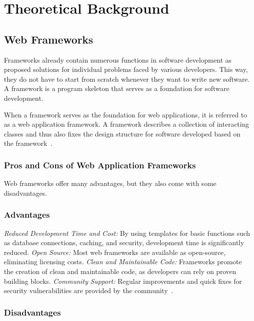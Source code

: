 \documentclass[conference]{IEEEtran}
\begin{document}
\section{Theoretical Background}

\subsection{Web Frameworks}

Frameworks already contain numerous functions in software development as proposed solutions for individual problems faced by various developers. This way, they do not have to start from scratch whenever they want to write new software. A framework is a program skeleton that serves as a foundation for software development.

When a framework serves as the foundation for web applications, it is referred to as a web application framework. A framework describes a collection of interacting classes and thus also fixes the design structure for software developed based on the framework~\cite{ionos_webframeworks}.
\newline\subsubsection{Pros and Cons of Web Application Frameworks}
Web frameworks offer many advantages, but they also come with some disadvantages.
\newline\subsubsection{Advantages}
\textit{Reduced Development Time and Cost:} By using templates for basic functions such as database connections, caching, and security, development time is significantly reduced.
\newline\textit{Open Source:} Most web frameworks are available as open-source, eliminating licensing costs.
\newline\textit{Clean and Maintainable Code:} Frameworks promote the creation of clean and maintainable code, as developers can rely on proven building blocks.
\newline\newline\newline\textit{Community Support:} Regular improvements and quick fixes for security vulnerabilities are provided by the community~\cite{ionos_webframeworks}.
\newline
\subsubsection{Disadvantages}
\end{document}
